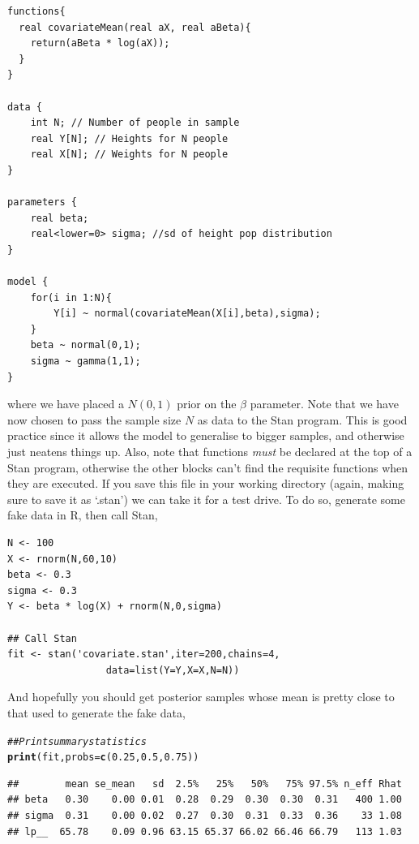 \documentclass[11pt,fullpage]{book}
\makeatletter
\newenvironment{kframe}{%
	\def\at@end@of@kframe{}%
	\ifinner\ifhmode%
	\def\at@end@of@kframe{\end{minipage}}%
\begin{minipage}{\columnwidth}%
	\fi\fi%
	\def\FrameCommand##1{\hskip\@totalleftmargin \hskip-\fboxsep
		\colorbox{shadecolor}{##1}\hskip-\fboxsep
		\hskip-\linewidth \hskip-\@totalleftmargin \hskip\columnwidth}%
	\MakeFramed {\advance\hsize-\width
		\@totalleftmargin\z@ \linewidth\hsize
		\@setminipage}}%
{\par\unskip\endMakeFramed%
	\at@end@of@kframe}
\newcommand{\hlnum}[1]{\textcolor[rgb]{0.686,0.059,0.569}{#1}}%
\newcommand{\hlcom}[1]{\textcolor[rgb]{0.678,0.584,0.686}{\textit{#1}}}%
\newcommand{\hlstd}[1]{\textcolor[rgb]{0.345,0.345,0.345}{#1}}%
\newcommand{\hlkwc}[1]{\textcolor[rgb]{0.333,0.667,0.333}{#1}}%
\newcommand{\hlkwd}[1]{\textcolor[rgb]{0.737,0.353,0.396}{\textbf{#1}}}%
\newenvironment{knitrout}{}{} %
\makeatother
\begin{document}
\begin{verbatim}
functions{
  real covariateMean(real aX, real aBeta){
    return(aBeta * log(aX));
  }
}

data {
    int N; // Number of people in sample
    real Y[N]; // Heights for N people
    real X[N]; // Weights for N people
}

parameters {
    real beta;
    real<lower=0> sigma; //sd of height pop distribution
}

model {
    for(i in 1:N){
        Y[i] ~ normal(covariateMean(X[i],beta),sigma);
    }
    beta ~ normal(0,1);
    sigma ~ gamma(1,1);
}
\end{verbatim}
where we have placed a $N(0,1)$ prior on the $\beta$ parameter. Note that we have now chosen to pass the sample size $N$ as data to the Stan program. This is good practice since it allows the model to generalise to bigger samples, and otherwise just neatens things up. Also, note that functions \textit{must} be declared at the top of a Stan program, otherwise the other blocks can't find the requisite functions when they are executed. If you save this file in your working directory (again, making sure to save it as `.stan') we can take it for a test drive. To do so, generate some fake data in R, then call Stan,
\begin{verbatim}
N <- 100
X <- rnorm(N,60,10)
beta <- 0.3
sigma <- 0.3
Y <- beta * log(X) + rnorm(N,0,sigma)

## Call Stan
fit <- stan('covariate.stan',iter=200,chains=4,
                 data=list(Y=Y,X=X,N=N))
\end{verbatim}
And hopefully you should get posterior samples whose mean is pretty close to that used to generate the fake data,

\begin{knitrout}\small
		\color{fgcolor}\begin{kframe}
			\begin{alltt}
				\hlcom{## Print summary statistics}
				\hlkwd{print}\hlstd{(fit,}\hlkwc{probs} \hlstd{=} \hlkwd{c}\hlstd{(}\hlnum{0.25}\hlstd{,} \hlnum{0.5}\hlstd{,} \hlnum{0.75}\hlstd{))}
			\end{alltt}
			\begin{verbatim}
##        mean se_mean   sd  2.5%   25%   50%   75% 97.5% n_eff Rhat
## beta   0.30    0.00 0.01  0.28  0.29  0.30  0.30  0.31   400 1.00
## sigma  0.31    0.00 0.02  0.27  0.30  0.31  0.33  0.36    33 1.08
## lp__  65.78    0.09 0.96 63.15 65.37 66.02 66.46 66.79   113 1.03
			\end{verbatim}
		\end{kframe}
	\end{knitrout}
\end{document}
